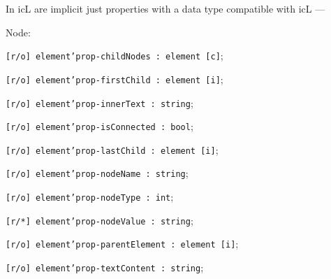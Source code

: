 In icL are implicit just properties with a data type compatible with icL —
\begin{icItems}
	\item Node:	
	\begin{icItems}
		\item \texttt{[r/o] element'prop-childNodes : element [c]};
		\item \texttt{[r/o] element'prop-firstChild : element [i]};
		\item \texttt{[r/o] element'prop-innerText : string};
		\item \texttt{[r/o] element'prop-isConnected : bool};
		\item \texttt{[r/o] element'prop-lastChild : element [i]};
		\item \texttt{[r/o] element'prop-nodeName : string};
		\item \texttt{[r/o] element'prop-nodeType : int};
		\item \texttt{[r/*] element'prop-nodeValue : string};
		\item \texttt{[r/o] element'prop-parentElement : element [i]};
		\item \texttt{[r/o] element'prop-textContent : string};
	\end{icItems}
	

\end{icItems}
